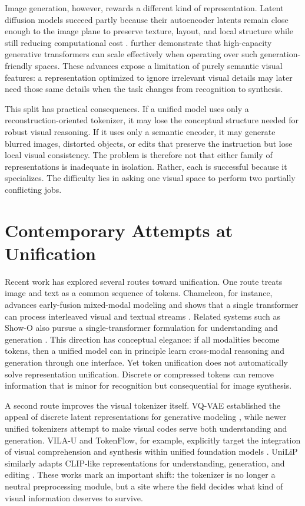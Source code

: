 \documentclass[12pt]{article}
\begin{document}
Image generation, however, rewards a different kind of representation. Latent diffusion models succeed partly because their autoencoder latents remain close enough to the image plane to preserve texture, layout, and local structure while still reducing computational cost \citep{rombach2022high}. \citet{esser2024scaling} further demonstrate that high-capacity generative transformers can scale effectively when operating over such generation-friendly spaces. These advances expose a limitation of purely semantic visual features: a representation optimized to ignore irrelevant visual details may later need those same details when the task changes from recognition to synthesis.

This split has practical consequences. If a unified model uses only a reconstruction-oriented tokenizer, it may lose the conceptual structure needed for robust visual reasoning. If it uses only a semantic encoder, it may generate blurred images, distorted objects, or edits that preserve the instruction but lose local visual consistency. The problem is therefore not that either family of representations is inadequate in isolation. Rather, each is successful because it specializes. The difficulty lies in asking one visual space to perform two partially conflicting jobs.

\section{Contemporary Attempts at Unification}

Recent work has explored several routes toward unification. One route treats image and text as a common sequence of tokens. Chameleon, for instance, advances early-fusion mixed-modal modeling and shows that a single transformer can process interleaved visual and textual streams \citep{team2024chameleon}. Related systems such as Show-O also pursue a single-transformer formulation for understanding and generation \citep{xie2024showo}. This direction has conceptual elegance: if all modalities become tokens, then a unified model can in principle learn cross-modal reasoning and generation through one interface. Yet token unification does not automatically solve representation unification. Discrete or compressed tokens can remove information that is minor for recognition but consequential for image synthesis.

A second route improves the visual tokenizer itself. VQ-VAE established the appeal of discrete latent representations for generative modeling \citep{oord2017neural}, while newer unified tokenizers attempt to make visual codes serve both understanding and generation. VILA-U and TokenFlow, for example, explicitly target the integration of visual comprehension and synthesis within unified foundation models \citep{wu2024vilau,qu2025tokenflow}. UniLiP similarly adapts CLIP-like representations for understanding, generation, and editing \citep{tang2025unilip}. These works mark an important shift: the tokenizer is no longer a neutral preprocessing module, but a site where the field decides what kind of visual information deserves to survive.
\end{document}
